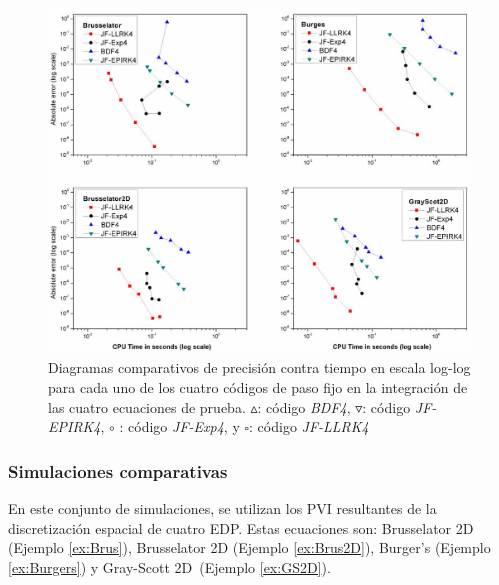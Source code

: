 \vspace{0.4cm}

\begin{figure}[htb]
	\centering
	\includegraphics[width=1\textwidth]{Graphics/lldp-fj/Diagram_new.jpg}
	\caption{Diagramas comparativos de precisión contra tiempo en escala log-log para cada uno de los cuatro códigos de paso fijo en la integración de las cuatro ecuaciones de prueba. $\vartriangle$: código \emph{BDF4}, $\triangledown$: código \emph{JF-EPIRK4},  $\circ$ : código \emph{JF-Exp4}, y $\square$: código \emph{JF-LLRK4}} \label{work-precision diagram}
\end{figure}


\subsubsection{Simulaciones comparativas}\label{sc:comparison}

En este conjunto de simulaciones, se utilizan los PVI resultantes de la discretización espacial de cuatro EDP. Estas ecuaciones son: Brusselator 2D (Ejemplo \ref{ex:Brus}), Brusselator 2D (Ejemplo \ref{ex:Brus2D}), Burger's (Ejemplo \ref{ex:Burgers}) y Gray-Scott 2D~(Ejemplo \ref{ex:GS2D}).

